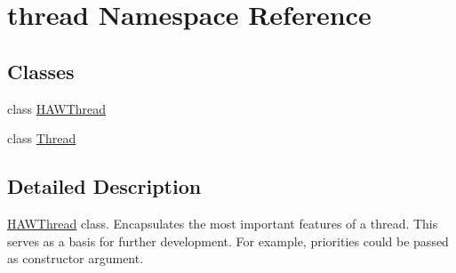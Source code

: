 \hypertarget{namespacethread}{\section{thread Namespace Reference}
\label{namespacethread}
}
\subsection*{Classes}
\begin{DoxyCompactItemize}
\item 
class \hyperlink{classthread_1_1_h_a_w_thread}{H\-A\-W\-Thread}
\item 
class \hyperlink{classthread_1_1_thread}{Thread}
\end{DoxyCompactItemize}


\subsection{Detailed Description}
\hyperlink{classthread_1_1_h_a_w_thread}{H\-A\-W\-Thread} class. Encapsulates the most important features of a thread. This serves as a basis for further development. For example, priorities could be passed as constructor argument. 
